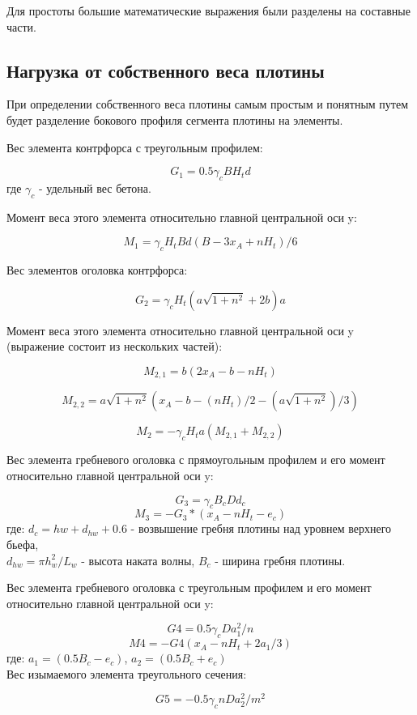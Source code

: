 \documentclass[12pt,a4paper,oneside,draft,titlepage]{article}
\begin{document}
Для простоты большие математические выражения были разделены на составные части.

\subsection{Нагрузка от собственного веса плотины}

При определении собственного веса плотины самым простым и понятным путем будет разделение бокового профиля сегмента плотины на элементы.

Вес элемента контрфорса с треугольным профилем:

$$ G_1 = 0.5  \gamma_c  B  H_t  d $$
где $\gamma_c$ - удельный вес бетона.

Момент веса этого элемента относительно главной центральной оси y:

$$ M_1 = \gamma_c  H_t  B  d  (B - 3  x_A + n  H_t) / 6 $$

Вес элементов оголовка контрфорса:

$$ G_2 = \gamma_c  H_t  (a  \sqrt{1 + n ^ 2} + 2  b)  a $$

Момент веса этого элемента относительно главной центральной оси y (выражение состоит из нескольких частей):

$$ M_{2,1} = b  (2  x_A - b - n  H_t) $$
 
$$ M_{2,2} = a  \sqrt{1 + n ^ 2}  (x_A - b - (n  H_t) / 2 - (a  \sqrt{1 + n ^ 2}) / 3) $$
 
$$ M_2 = -\gamma_c  H_t  a ( M_{2,1} + M_{2,2} ) $$


Вес элемента гребневого оголовка с прямоугольным профилем и его момент относительно главной центральной оси y:

$$ G_3 = \gamma_c  B_c  D  d_c $$
$$ M_3 = -G_3 * (x_A - n  H_t - e_c) $$
где: $ d_c = hw + d_{hw} + 0.6 $ - возвышение гребня плотины над уровнем верхнего бьефа,\\
$ d_{hw} = \pi  h_w ^ 2 / L_w $ - высота наката волны,
$B_c$ - ширина гребня плотины.

Вес элемента гребневого оголовка с треугольным профилем и его момент относительно главной центральной оси y: 

$$ G4 = 0.5  \gamma_c  D  a_1 ^ 2 / n $$
$$ M4 = -G4  (x_A - n  H_t + 2  a_1 / 3) $$
где: $ a_1 = (0.5  B_c - e_c) $, $ a_2 = (0.5  B_c + e_c) $\\

Вес изымаемого элемента треугольного сечения:

$$ G5 = -0.5  \gamma_c  n  D  a_2 ^ 2 / m ^ 2 $$
\end{document}
